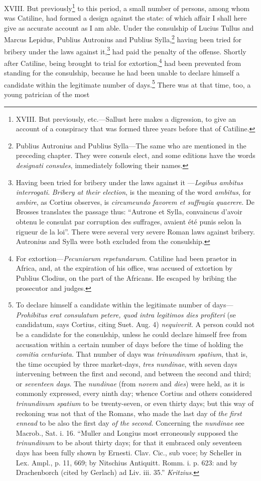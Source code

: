 XVIII. But previously\footnote{XVIII. But previously, etc.—Sallust here makes a digression,
to give an account of a conspiracy that was formed three years before
that of Catiline.} to this period, a small number of persons,
among whom was Catiline, had formed a design against the state: of
which affair I shall here give as accurate account as I am able. Under
the consulship of Lucius Tullus and Marcus Lepidus, Publius Autronius
and Publius Sylla,\footnote{Publius Autronius and Publius Sylla—The same who are mentioned
in the preceding chapter. They were consuls elect, and some editions
have the words \emph{designati consules}, immediately following their names.} having been tried for bribery under the laws
against it,\footnote{Having been tried for bribery under the laws against it
—\emph{Legibus ambitus interrogati}. \emph{Bribery at their election}, is the
meaning of the word \emph{ambitus}, for \emph{ambire}, as Cortius observes, is
\emph{circumeundo favorem et suffragia quaerere}. De Brosses translates the
passage thus: ``Autrone et Sylla, convaincus d'avoir obtenu le consulat
par corruption des suffrages, avaient été punis selon la rigueur de la
loi''. There were several very severe Roman laws against bribery.
Autronius and Sylla were both excluded from the consulship.} had paid the penalty of the offense. Shortly after
Catiline, being brought to trial for extortion,\footnote{For extortion—\emph{Pecuniarum repetundarum}. Catiline had been
praetor in Africa, and, at the expiration of his office, was accused
of extortion by Publius Clodius, on the part of the Africans. He
escaped by bribing the prosecutor and judges.} had been
prevented from standing for the consulship, because he had been unable
to declare himself a candidate within the legitimate number of
days.\footnote{To declare himself a candidate within the legitimate number
of days—\emph{Prohibitus erat consulatum petere, quod intra legitimos
dies profiteri} (se candidatum, says Cortius, citing Suet. Aug. 4)
\emph{nequiverit}. A person could not be a candidate for the consulship,
unless he could declare himself free from accusation within a certain
number of days before the time of holding the \emph{comitia centuriata}.
That number of days was \emph{trinundinum spatium}, that is, the time
occupied by three market-days, \emph{tres nundinae}, with seven days
intervening between the first and second, and between the second and
third; or \emph{seventeen days}. The \emph{nundinae} (from \emph{novem} and \emph{dies})
were held, as it is commonly expressed, every ninth day; whence
Cortius and others considered \emph{trinundinum spatium} to be twenty-seven,
or even thirty days; but this way of reckoning was not that of the
Romans, who made the last day of \emph{the first ennead} to be also the first
day \emph{of the second}. Concerning the \emph{nundinae} see Macrob., Sat. i. 16.
``Muller and Longius most erroneously supposed the \emph{trinundinum} to be
about thirty days; for that it embraced only seventeen days has been
fully shown by Ernesti. Clav. Cic., sub voce; by Scheller in Lex. Ampl.,
p. 11, 669; by Nitschius Antiquitt. Romm. i. p. 623: and by Drachenborch
(cited by Gerlach) ad Liv. iii. 35.'' \emph{Kritzius}.} There was at that time, too, a young patrician of the most

